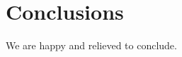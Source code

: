 
\setcounter{chapter}{11}


\chapter{Conclusions}



\vskip 0.4in

We are happy and relieved to conclude.